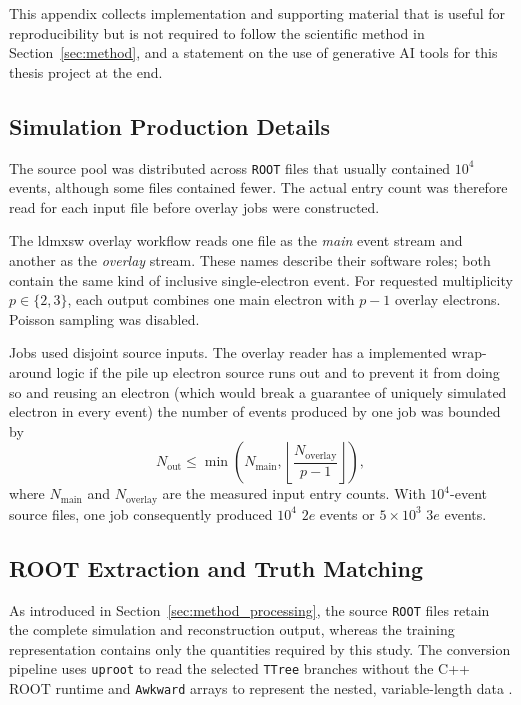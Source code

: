 This appendix collects implementation and supporting material that is useful
for reproducibility but is not required to follow the scientific method in
Section~\ref{sec:method}, and a statement on the use of generative AI tools for this thesis project at the end.

\subsection{Simulation Production Details}
\label{sec:appendix_overlay}

The source pool was distributed across \texttt{ROOT} files that usually
contained \(10^4\) events, although some files contained fewer. The actual
entry count was therefore read for each input file before overlay jobs were
constructed.

The \gls{ldmxsw} overlay workflow reads one file as the \emph{main} event
stream and another as the \emph{overlay} stream. These names describe their
software roles; both contain the same kind of inclusive single-electron event.
For requested multiplicity \(p\in\{2,3\}\), each output combines one main
electron with \(p-1\) overlay electrons. Poisson sampling was disabled.

Jobs used disjoint source inputs. The overlay reader has a implemented wrap-around logic if the pile up electron source runs out and to prevent it from doing so and reusing an electron (which would break a guarantee of uniquely simulated electron in every event) the number of events produced by one job was bounded by
\begin{equation}
    N_{\mathrm{out}}
    \leq
    \min\left(
        N_{\mathrm{main}},
        \left\lfloor
            \frac{N_{\mathrm{overlay}}}{p-1}
        \right\rfloor
    \right),
    \label{eq:appendix_overlay_limit}
\end{equation}
where \(N_{\mathrm{main}}\) and \(N_{\mathrm{overlay}}\) are the measured
input entry counts. With \(10^4\)-event source files, one job consequently
produced \(10^4\) \(2e\) events or \(5\times10^3\) \(3e\) events.

\subsection{ROOT Extraction and Truth Matching}
\label{sec:appendix_root_conversion}

As introduced in Section~\ref{sec:method_processing}, the source
\texttt{ROOT} files retain the complete simulation and reconstruction output,
whereas the training representation contains only the quantities required by
this study. The conversion pipeline uses \texttt{uproot} to read the selected
\texttt{TTree} branches without the C++ ROOT runtime and \texttt{Awkward}
arrays to represent the nested, variable-length data
\cite{uproot_docs,awkward_docs}.

